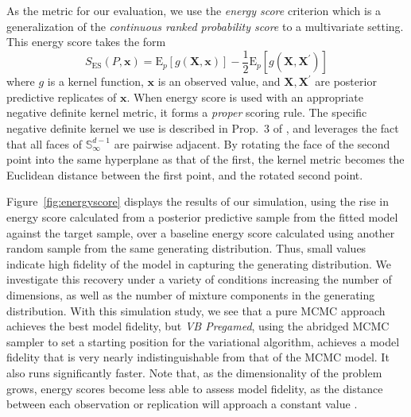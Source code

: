 As the metric for our evaluation, we use the \emph{energy score} criterion 
    \citep{gneiting2007} which is a generalization of the 
    \emph{continuous ranked probability score} to a multivariate setting.  This energy 
    score takes the form
    \[
      S_{\text{ES}}(P, \bm{x}) = \text{E}_p\left[g(\bm{X},\bm{x})\right] - 
        \frac{1}{2}\text{E}_p\left[g(\bm{X},\bm{X}^{\prime})\right]
    \]
    where $g$ is a kernel function, $\bm{x}$ is an observed value, and 
    $\bm{X},\bm{X}^{\prime}$ are posterior predictive replicates of $\bm{x}$.
    When energy score is used with an appropriate negative definite kernel 
    metric, it forms a \emph{proper} scoring rule. The specific negative 
    definite kernel we use is described in Prop.~3 of \cite{trubey:pg}, 
    and leverages the fact that all faces of $\mathbb{S}_{\infty}^{d-1}$
    are pairwise adjacent.  By rotating the face of the second point into 
    the same hyperplane as that of the first, the kernel metric becomes the 
    Euclidean distance between the first point, and the rotated second point.
    
Figure~\ref{fig:energyscore} displays the results of our simulation, using the rise 
    in energy score calculated from a posterior predictive sample from the fitted 
    model against the target sample, over a baseline energy score calculated using 
    another random sample from the same generating distribution.  Thus, small values 
    indicate high fidelity of the model in capturing the generating distribution. We 
    investigate this recovery under a variety of conditions increasing the number of 
    dimensions, as well as the number of mixture components in the generating 
    distribution. With this simulation study, we see that a pure MCMC approach 
    achieves the best model fidelity, but \emph{VB Pregamed}, using the abridged 
    MCMC sampler to set a starting position for the variational algorithm, achieves 
    a model fidelity that is very nearly indistinguishable from that of the MCMC model.  
    It also runs significantly faster. Note that, as the dimensionality of the problem 
    grows, energy scores become less able to assess model fidelity, as the distance 
    between each observation or replication will approach a constant value 
    \citep{bishop2006}.
    

